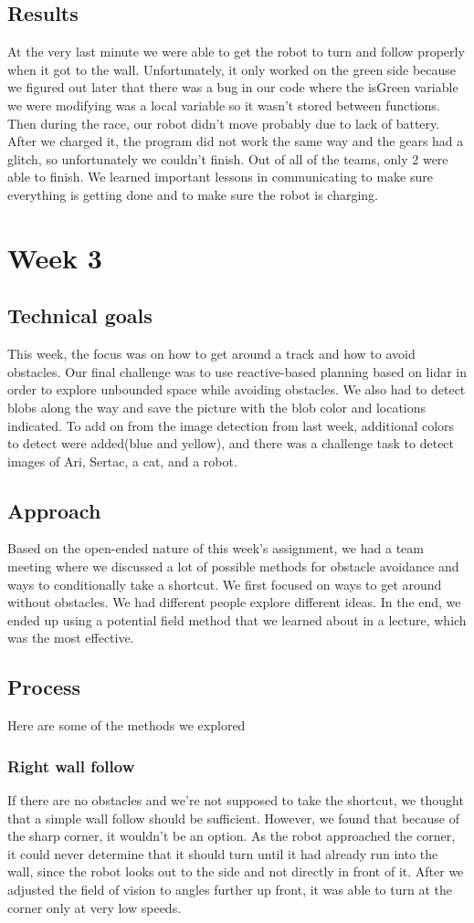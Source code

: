 \documentclass[journal, a4paper]{IEEEtran}
\begin{document}
\subsection{Results}
At the very last minute we were able to get the robot to turn and follow properly when it got to the wall. Unfortunately, it only worked on the green side because we figured out later that there was a bug in our code where the isGreen variable we were modifying was a local variable so it wasn't stored between functions. Then during the race, our robot didn’t move probably due to lack of battery. After we charged it, the program did not work the same way and the gears had a glitch, so unfortunately we couldn’t finish. Out of all of the teams, only 2 were able to finish. We learned important lessons in communicating to make sure everything is getting done and to make sure the robot is charging. 
\section{Week 3}
\subsection{Technical goals}
This week, the focus was on how to get around a track and how to avoid obstacles. Our final challenge was to use reactive-based planning based on lidar in order to explore unbounded space while avoiding obstacles. We also had to detect blobs along the way and save the picture with the blob color and locations indicated. To add on from the image detection from last week, additional colors to detect were added(blue and yellow), and there was a challenge task to detect images of Ari, Sertac, a cat, and a robot. 
\subsection{Approach}
Based on the open-ended nature of this week’s assignment, we had a team meeting where we discussed a lot of possible methods for obstacle avoidance and ways to conditionally take a shortcut. We first focused on ways to get around without obstacles. We had different people explore different ideas. In the end, we ended up using a potential field method that we learned about in a lecture, which was the most effective.
\subsection{Process}
Here are some of the methods we explored
\subsubsection{Right wall follow}
If there are no obstacles and we’re not supposed to take the shortcut, we thought that a simple wall follow should be sufficient. However, we found that because of the sharp corner, it wouldn’t be an option. As the robot approached the corner, it could never determine that it should turn until it had already run into the wall, since the robot looks out to the side and not directly in front of it. After we adjusted the field of vision to angles further up front, it was able to turn at the corner only at very low speeds. 
\end{document}
